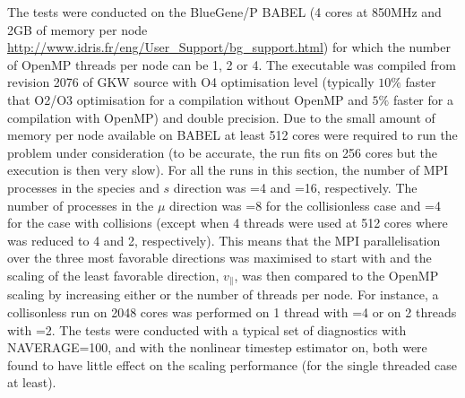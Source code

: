 The tests were conducted on the BlueGene/P BABEL (4 cores at 850MHz and 2GB of memory per node \url{http://www.idris.fr/eng/User_Support/bg_support.html}) for which the number of OpenMP threads per node can be 1, 2 or 4. The executable was compiled from revision 2076 of GKW source with O4 optimisation level (typically $10\%$ faster that O2/O3 optimisation for a compilation without OpenMP and $5\%$ faster for a compilation with OpenMP) and double precision. Due to the small amount of memory per node available on BABEL at least 512 cores were required to run the problem under consideration (to be accurate, the run fits on 256 cores but the execution is then very slow). For all the runs in this section, the number of MPI processes in the species and $s$ direction was =4 and =16, respectively. The number of processes in the $\mu$ direction was =8 for the collisionless case and =4 for the case with collisions (except when 4 threads were used at 512 cores where  was reduced to 4 and 2, respectively). This means that the MPI parallelisation over the three most favorable directions was maximised to start with and the scaling of the least favorable direction, $v_\parallel$, was then compared to the OpenMP scaling by increasing either  or the number of threads per node. For instance, a collisonless run on 2048 cores was performed on 1 thread with =4 or on 2 threads with =2.  The tests were conducted with a typical set of diagnostics with NAVERAGE=100, and with the nonlinear timestep estimator on, both were found to have little effect on the scaling performance (for the single threaded case at least).

